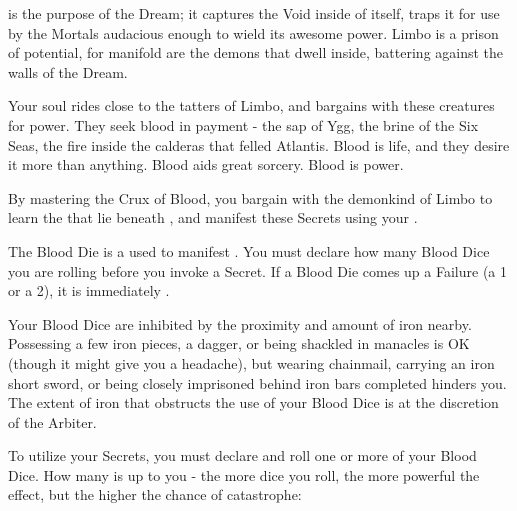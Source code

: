 

 is the purpose of the Dream; it captures the Void inside of itself, traps it for use by the Mortals audacious enough to wield its awesome power. Limbo is a prison of potential, for manifold are the demons that dwell inside, battering against the walls of the Dream. 

Your soul rides close to the tatters of Limbo, and bargains with these creatures for power. They seek blood in payment - the sap of Ygg, the brine of the Six Seas, the fire inside the calderas that felled Atlantis. Blood is life, and they desire it more than anything. Blood aids great sorcery. Blood is power.

By mastering the Crux of Blood, you bargain with the demonkind of Limbo to learn the  that lie beneath , and manifest these Secrets using your .



The Blood Die is a  used to manifest . You must declare how many Blood Dice you are rolling before you invoke a Secret. If a Blood Die comes up a Failure (a 1 or a 2), it is immediately .

Your Blood Dice are inhibited by the proximity and amount of iron nearby. Possessing a few iron pieces, a dagger, or being shackled in manacles is OK (though it might give you a headache), but wearing chainmail, carrying an iron short sword, or being closely imprisoned behind iron bars completed hinders you. The extent of iron that obstructs the use of your Blood Dice is at the discretion of the Arbiter.

\cbreak


To utilize your Secrets, you must declare and roll one or more of your Blood Dice.  How many is up to you - the more dice you roll, the more powerful the effect, but the higher the chance of catastrophe:


